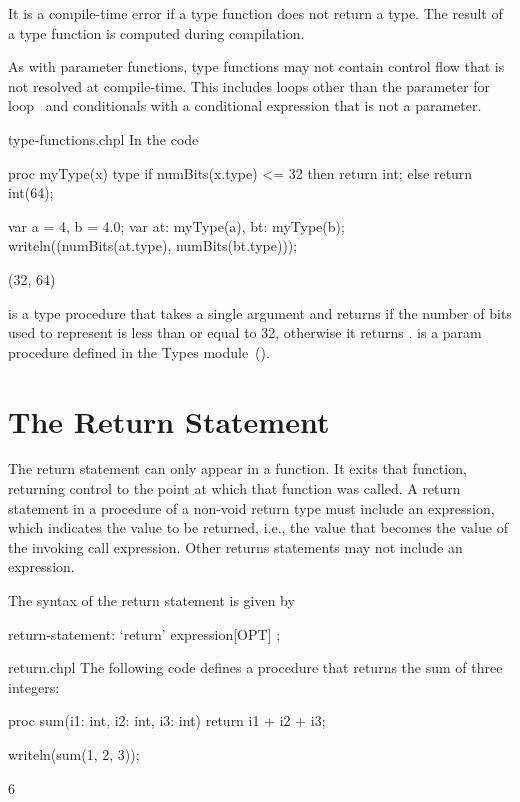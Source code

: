 It is a compile-time error if a type function does not return a type.
The result of a type function is computed during compilation.

As with parameter functions, type functions may not contain control
flow that is not resolved at compile-time.  This includes loops other
than the parameter for loop~ and
conditionals with a conditional expression that is not a parameter.

\begin{chapelexample}{type-functions.chpl}
In the code
\begin{chapel}
proc myType(x) type {
  if numBits(x.type) <= 32 then return int;
  else return int(64);
}
\end{chapel}
\begin{chapelpost}
var a = 4,
    b = 4.0;
var at: myType(a),
    bt: myType(b);
writeln((numBits(at.type), numBits(bt.type)));
\end{chapelpost}
\begin{chapeloutput}
(32, 64)
\end{chapeloutput}
 is a type procedure that takes a single
argument  and returns  if the number of bits used to
represent  is less than or equal to 32, otherwise it
returns .   is a param
procedure defined in the Types module~().
\end{chapelexample}


\section{The Return Statement}
\label{The_Return_Statement}

The return statement can only appear in a function.  It exits that
function, returning control to the point at which that function was
called.  A return statement in a procedure of a non-void return type
must include an expression, which indicates the value to be returned,
i.e., the value that becomes the value of the invoking call expression.
Other returns statements may not include an expression.

The syntax of the return statement is given by
\begin{syntax}
return-statement:
  `return' expression[OPT] ;
\end{syntax}

\begin{chapelexample}{return.chpl}
The following code defines a procedure that returns the sum of three
integers:
\begin{chapel}
proc sum(i1: int, i2: int, i3: int)
  return i1 + i2 + i3;
\end{chapel}
\begin{chapelpost}
writeln(sum(1, 2, 3));
\end{chapelpost}
\begin{chapeloutput}
6
\end{chapeloutput}
\end{chapelexample}


